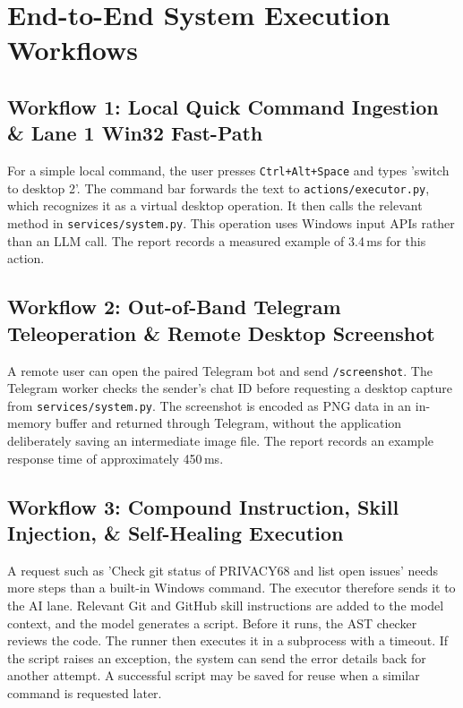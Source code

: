 \documentclass[12pt,letterpaper,oneside]{report}
\begin{document}
\section{End-to-End System Execution Workflows}
\subsection{Workflow 1: Local Quick Command Ingestion \& Lane 1 Win32 Fast-Path}
For a simple local command, the user presses \texttt{Ctrl+Alt+Space} and types 'switch to desktop 2'. The command bar forwards the text to \texttt{actions/executor.py}, which recognizes it as a virtual desktop operation. It then calls the relevant method in \texttt{services/system.py}. This operation uses Windows input APIs rather than an LLM call. The report records a measured example of 3.4\,ms for this action.

\subsection{Workflow 2: Out-of-Band Telegram Teleoperation \& Remote Desktop Screenshot}
A remote user can open the paired Telegram bot and send \texttt{/screenshot}. The Telegram worker checks the sender's chat ID before requesting a desktop capture from \texttt{services/system.py}. The screenshot is encoded as PNG data in an in-memory buffer and returned through Telegram, without the application deliberately saving an intermediate image file. The report records an example response time of approximately 450\,ms.

\subsection{Workflow 3: Compound Instruction, Skill Injection, \& Self-Healing Execution}
A request such as 'Check git status of PRIVACY68 and list open issues' needs more steps than a built-in Windows command. The executor therefore sends it to the AI lane. Relevant Git and GitHub skill instructions are added to the model context, and the model generates a script. Before it runs, the AST checker reviews the code. The runner then executes it in a subprocess with a timeout. If the script raises an exception, the system can send the error details back for another attempt. A successful script may be saved for reuse when a similar command is requested later.
\end{document}
